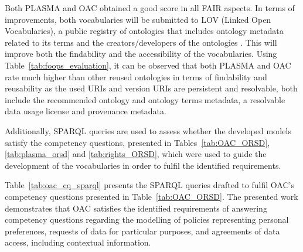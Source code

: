 Both PLASMA and OAC obtained a good score in all FAIR aspects.
In terms of improvements, both vocabularies will be submitted to LOV (Linked Open Vocabularies), a public registry of ontologies that includes ontology metadata related to its terms and the creators/developers of the ontologies \citep{dumontier_linked_2017}.
This will improve both the findability and the accessibility of the vocabularies.
Using Table~\ref{tab:foops_evaluation}, it can be observed that both PLASMA and OAC rate much higher than other reused ontologies in terms of findability and reusability as the used URIs and version URIs are persistent and resolvable, both include the recommended ontology and ontology terms metadata, a resolvable data usage license and provenance metadata.

Additionally, SPARQL queries are used to assess whether the developed models satisfy the competency questions, presented in Tables~\ref{tab:OAC_ORSD}, \ref{tab:plasma_orsd} and \ref{tab:rights_ORSD}, which were used to guide the development of the vocabularies in order to fulfil the identified requirements.

Table~\ref{tab:oac_cq_sparql} presents the SPARQL queries drafted to fulfil OAC's competency questions presented in Table~\ref{tab:OAC_ORSD}.
The presented work demonstrates that OAC satisfies the identified requirements of answering competency questions regarding the modelling of policies representing personal preferences, requests of data for particular purposes, and agreements of data access, including contextual information.

